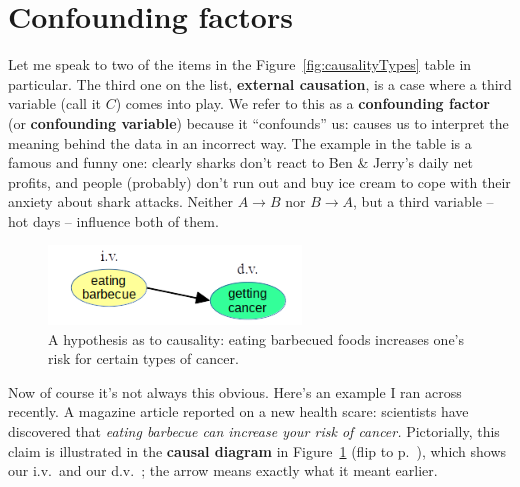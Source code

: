 \section{Confounding factors}


Let me speak to two of the items in the Figure~\ref{fig:causalityTypes} table
in particular. The third one on the list, \textbf{external causation}, is a
case where a third variable (call it $C$) comes into play. We refer to this as
a \textbf{confounding factor} (or \textbf{confounding variable}) because it
``confounds'' us: causes us to interpret the meaning behind the data in an
incorrect way. The example in the table is a famous and funny one: clearly
sharks don't react to Ben \& Jerry's daily net profits, and people (probably)
don't run out and buy ice cream to cope with their anxiety about shark attacks.
Neither $A \rightarrow B$ nor $B \rightarrow A$, but a third variable -- hot
days -- influence both of them.

\begin{figure}[ht]
\centering
\includegraphics[width=0.6\textwidth]{causalDiagram.png}
\caption{A hypothesis as to causality: eating barbecued foods increases one's
risk for certain types of cancer.}
\label{fig:causalDiagram}
\end{figure}

\label{barbecue}


Now of course it's not always this obvious. Here's an example I ran across
recently. A magazine article reported on a new health scare: scientists have
discovered that \textit{eating barbecue can increase your risk of cancer.}
Pictorially, this claim is illustrated in the \textbf{causal diagram} in
Figure~\ref{fig:causalDiagram} (flip to p.~\pageref{fig:causalDiagram}), which
shows our i.v.~and our d.v.~; the arrow means exactly what it meant earlier.

